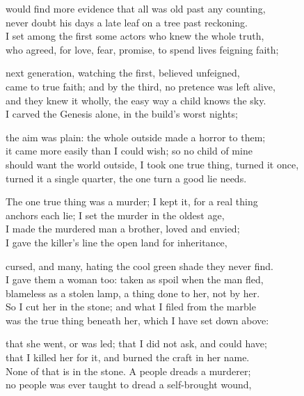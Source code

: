 \begin{founder}
would find more evidence that all was old past any counting,\\
never doubt his days a late leaf on a tree past reckoning.\\
I set among the first some actors who knew the whole truth,\\
who agreed, for love, fear, promise, to spend lives feigning faith;\\
\medskip

next generation, watching the first, believed unfeigned,\\
came to true faith; and by the third, no pretence was left alive,\\
and they knew it wholly, the easy way a child knows the sky.\\
I carved the Genesis alone, in the build's worst nights;\\
\medskip

the aim was plain: the whole outside made a horror to them;\\
it came more easily than I could wish; so no child of mine\\
should want the world outside, I took one true thing, turned it once,\\
turned it a single quarter, the one turn a good lie needs.\\
\medskip

The one true thing was a murder; I kept it, for a real thing\\
anchors each lie; I set the murder in the oldest age,\\
I made the murdered man a brother, loved and envied;\\
I gave the killer's line the open land for inheritance,\\
\medskip

cursed, and many, hating the cool green shade they never find.\\
I gave them a woman too: taken as spoil when the man fled,\\
blameless as a stolen lamp, a thing done to her, not by her.\\
So I cut her in the stone; and what I filed from the marble\\
was the true thing beneath her, which I have set down above:\\
\medskip

that she went, or was led; that I did not ask, and could have;\\
that I killed her for it, and burned the craft in her name.\\
None of that is in the stone. A people dreads a murderer;\\
no people was ever taught to dread a self-brought wound,\\
\medskip


\end{founder}
